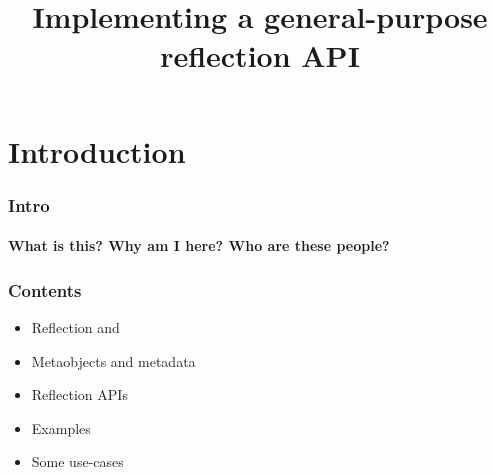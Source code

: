 \documentclass[compress,table,xcolor=table]{beamer}
\begin{document}
\title{Implementing a general-purpose reflection API}
\section{Introduction}
\begin{frame}
  \frametitle{Intro}
  \framesubtitle{What is this? Why am I here? Who are these people?}
\end{frame}
\begin{frame}
  \frametitle{Contents}
  \Large
  \begin{itemize}
    \item Reflection \smaller and 
    \item Metaobjects and metadata
    \item Reflection APIs
    \item Examples
    \item Some use-cases
  \end{itemize}
\end{frame}
\end{document}
